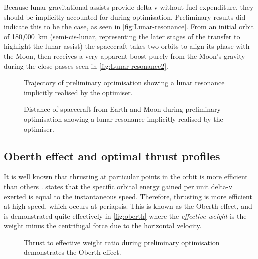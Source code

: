Because lunar gravitational assists provide delta-v without fuel expenditure, they should be implicitly accounted for during optimisation. Preliminary results did indicate this to be the case, as seen in \autoref{fig:Lunar-resonance}. From an initial orbit of 180,000~km (semi-cis-lunar, representing the later stages of the transfer to highlight the lunar assist) the spacecraft takes two orbits to align its phase with the Moon, then receives a very apparent boost purely from the Moon's gravity during the close passes seen in \autoref{fig:Lunar-resonance2}.

\begin{figure}
\caption{Trajectory of preliminary optimisation showing a lunar resonance implicitly realised by the optimiser.}
\label{fig:Lunar-resonance}
\centering
\def\svgwidth{\figurewidth}

\end{figure}

\begin{figure}
\caption{Distance of spacecraft from Earth and Moon during preliminary optimisation showing a lunar resonance implicitly realised by the optimiser.}
\label{fig:Lunar-resonance2}
\centering
\def\svgwidth{\figurewidth}

\end{figure}




\subsection{Oberth effect and optimal thrust profiles} \label{sub:Oberth}

It is well known that thrusting at particular points in the orbit is more efficient than others \parencite{Kemble2006}. \textcite{Oberth1923} states that the specific orbital energy gained per unit delta-v exerted is equal to the instantaneous speed. Therefore, thrusting is more efficient at high speed, which occurs at periapsis. This is known as the Oberth effect, and is demonstrated quite effectively in \autoref{fig:oberth} where the \emph{effective weight} is the weight minus the centrifugal force due to the horizontal velocity.

\begin{figure}
\caption{Thrust to effective weight ratio during preliminary optimisation demonstrates the Oberth effect.}
\label{fig:oberth}
\centering
\def\svgwidth{\figurewidth}

\end{figure}

